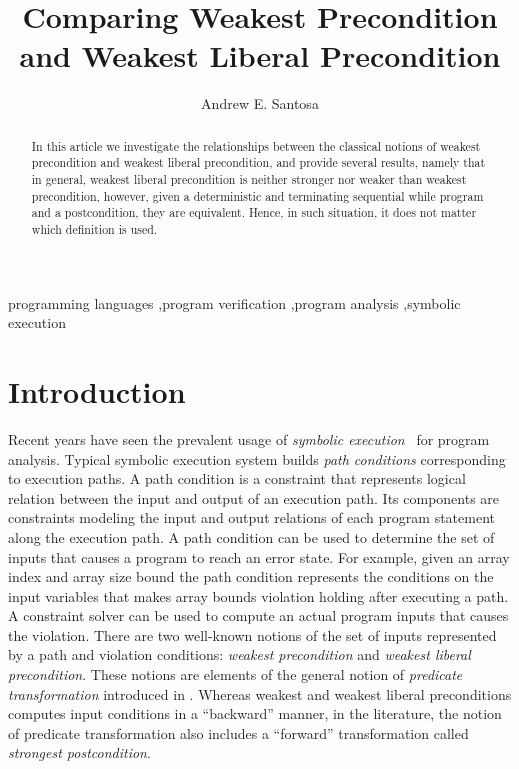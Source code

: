 \documentclass[times]{elsarticle}
\title{Comparing Weakest Precondition and Weakest Liberal Precondition}
\author{Andrew E. Santosa}
\begin{document}
\begin{abstract}
  In this article we investigate the relationships between the
classical notions of weakest precondition and weakest liberal
precondition, and provide several results, namely that in general,
weakest liberal precondition is neither stronger nor weaker than
weakest precondition, however, given a deterministic and terminating
sequential while program and a postcondition, they are equivalent.
Hence, in such situation, it does not matter which definition is used.
\end{abstract}

\begin{keyword}
programming languages \sep program verification \sep program analysis \sep symbolic execution
\end{keyword}

\maketitle

\section{Introduction}
\label{sec:intro}

Recent years have seen the prevalent usage of \emph{symbolic
  execution\/}~\cite{king76symbolic} for program analysis. Typical
symbolic execution system builds \emph{path conditions\/}
corresponding to execution paths.  A path condition is a constraint
that represents logical relation between the input and output of an
execution path.  Its components are constraints modeling the input and
output relations of each program statement along the execution path. A
path condition can be used to determine the set of inputs that causes
a program to reach an error state. For example, given an array index
 and array size bound  the path condition represents the
conditions on the input variables that makes array bounds violation
 holding after executing a path. A constraint solver can be
used to compute an actual program inputs that causes the
violation. There are two well-known notions of the set of inputs
represented by a path and violation conditions: \emph{weakest
  precondition\/} and \emph{weakest liberal precondition}. These
notions are elements of the general notion of \emph{predicate
  transformation\/} introduced in \cite{dijkstra75gcl}. Whereas
weakest and weakest liberal preconditions computes input conditions in
a ``backward'' manner, in the literature, the notion of predicate
transformation also includes a ``forward'' transformation called
\emph{strongest postcondition}.
\end{document}
